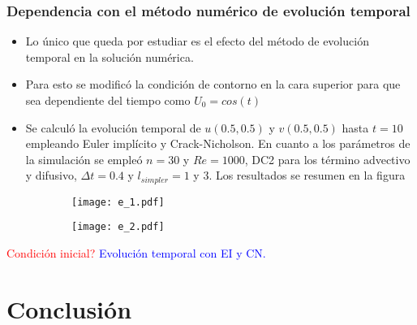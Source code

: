 \documentclass[aps,prb,twocolumn,superscriptaddress,floatfix,longbibliography,10pt]{revtex4-2}
\newcounter{para}
\begin{document}
\subsubsection{Dependencia con el método numérico de evolución temporal}
\begin{itemize}
  \item Lo único que queda por estudiar es el efecto del método de evolución temporal en la solución numérica.
  \item Para esto se modificó la condición de contorno en la cara superior para que sea dependiente del tiempo como $U_0 = cos(t)$
  \item Se calculó la evolución temporal de $u(0.5,0.5)$ y $v(0.5,0.5)$ hasta $t = 10$ empleando Euler implícito y Crack-Nicholson. En cuanto a los parámetros de la simulación se empleó $n = 30$ y $Re = 1000$, DC2 para los término advectivo y difusivo, $\Delta t = 0.4$ y $l_{simpler} = 1$ y $3$. Los resultados se resumen en la figura

\end{itemize}

\begin{figure}
  \centering
  \begin{subfigure}[b]{0.3\textwidth}
      \centering
      \texttt{[image: e\_1.pdf]}
      \caption{}
      \label{fig:e_1}
  \end{subfigure}
  \hfill
  \begin{subfigure}[b]{0.3\textwidth}
      \centering
      \texttt{[image: e\_2.pdf]}
      \caption{}
      \label{fig:e_2}
  \end{subfigure}
     \caption{}
     \label{fig:e}
\end{figure}


\textcolor{red}{Condición inicial?}
\textcolor{blue}{Evolución temporal con EI y CN.}








\section{Conclusión}


\end{document}
